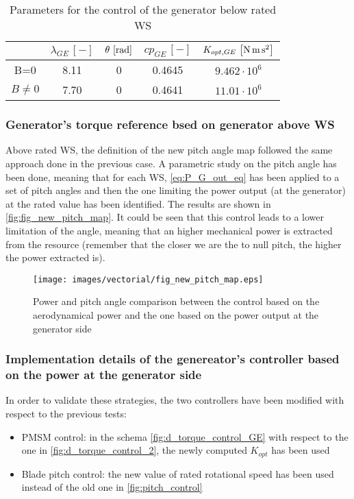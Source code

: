 \begin{table}[htb]
  \centering
  \caption{Parameters for the control of the generator below rated WS}
  \begin{tabular}{ccccc}
    \toprule
    & $\lambda_{GE} \, \left[-\right]$ & $\theta \, \left[\si{\radian}\right]$ & $cp_{GE} \, \left[-\right]$ & $K_{opt,GE} \, \left[\si{\newton\meter\square\second}\right]$ \\ \midrule
    B=0 & 8.11 & 0 & 0.4645 & $9.462 \cdot 10^6$\\
    $B\ne0$ & 7.70 & 0 & 0.4641 & $11.01 \cdot 10^6$\\ \bottomrule
  \end{tabular}
  \label{tab:tab_k_opt_GE}
\end{table}

\subsubsection[Above rated WS]{Generator's torque reference bsed on generator above WS}
Above rated WS, the definition of the new pitch angle map followed the same approach done in the previous case. A parametric study on the pitch angle has been done, meaning that for each WS, \autoref{eq:P_G_out_eq} has been applied to a set of pitch angles and then the one limiting the power output (at the generator) at the rated value has been identified. The results are shown in \autoref{fig:fig_new_pitch_map}. It could be seen that this control leads to a lower limitation of the angle, meaning that an higher mechanical power is extracted from the resource (remember that the closer we are the to null pitch, the higher the power extracted is).
\begin{figure}[htb]
  \centering
  \texttt{[image: images/vectorial/fig\_new\_pitch\_map.eps]}
  \caption{Power and pitch angle comparison between the control based on the aerodynamical power and the one based on the power output at the generator side}
  \label{fig:fig_new_pitch_map}
\end{figure}

\subsubsection[Implementation details]{Implementation details of the genereator's controller based on the power at the generator side}
In order to validate these strategies, the two controllers have been modified with respect to the previous tests:
\begin{itemize}
  \item PMSM control: in the schema \autoref{fig:d_torque_control_GE} with respect to the one in \autoref{fig:d_torque_control_2}, the newly computed  $K_{opt}$ has been used%
  \item Blade pitch control: the new value of rated rotational speed has been used instead of the old one in \autoref{fig:pitch_control}
\end{itemize}

